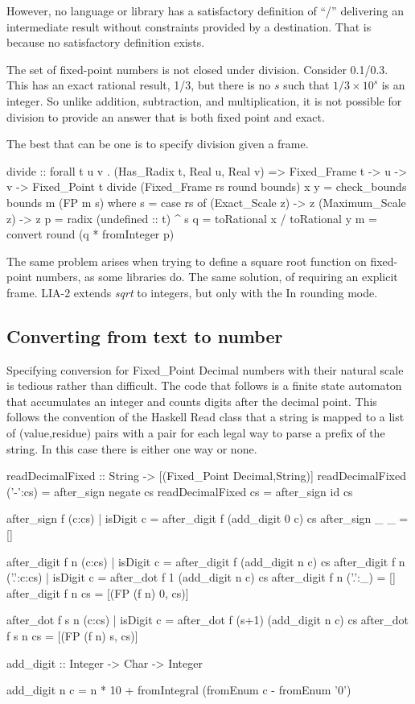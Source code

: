 \documentclass{article}
\begin{document}
However, no language or library has a satisfactory definition of
``/'' delivering an intermediate result without constraints
provided by a destination.  That is because no satisfactory
definition exists.

The set of fixed-point numbers is not closed under division.
Consider 0.1/0.3.  This has an exact rational result, 1/3,
but there is no $s$ such that $1/3 \times 10^s$ is an integer.
So unlike addition, subtraction, and multiplication, it is not
possible for division to provide an answer that is both fixed
point and exact.

The best that can be one is to specify division given a frame.

\begin{code}
divide :: forall t u v . (Has_Radix t, Real u, Real v) =>
          Fixed_Frame t -> u -> v -> Fixed_Point t
divide (Fixed_Frame rs round bounds) x y
  = check_bounds bounds m (FP m s)
  where
    s = case rs of
          (Exact_Scale   z) -> z
          (Maximum_Scale z) -> z
    p = radix (undefined :: t) ^ s
    q = toRational x / toRational y
    m = convert round (q * fromInteger p) 
\end{code}

The same problem arises when trying to define a square root
function on fixed-point numbers, as some libraries do.  The
same solution, of requiring an explicit frame.  LIA-2 extends
{\it sqrt} to integers, but only with the In rounding mode.

\subsection{Converting from text to number}

Specifying conversion for Fixed\_Point Decimal numbers
with their natural scale is tedious rather than difficult.
The code that follows is a finite state automaton that
accumulates an integer and counts digits after the decimal point.
This follows the convention of the Haskell Read class that
a string is mapped to a list of (value,residue) pairs with a
pair for each legal way to parse a prefix of the string.  In
this case there is either one way or none.

\begin{code}
readDecimalFixed :: String -> [(Fixed_Point Decimal,String)]
readDecimalFixed ('-':cs) = after_sign negate cs    
readDecimalFixed cs       = after_sign id     cs  

after_sign f (c:cs) 
  | isDigit c = after_digit f (add_digit 0 c) cs 
after_sign _ _ = []

after_digit f n (c:cs)
  | isDigit c = after_digit f (add_digit n c) cs     
after_digit f n ('.':c:cs)
  | isDigit c = after_dot f 1 (add_digit n c) cs                 
after_digit f n ('.':_) = []
after_digit f n cs = [(FP (f n) 0, cs)]
  
after_dot f s n (c:cs)
  | isDigit c = after_dot f (s+1) (add_digit n c) cs                
after_dot f s n cs = [(FP (f n) s, cs)]
  
add_digit :: Integer -> Char -> Integer

add_digit n c =
   n * 10 + fromIntegral (fromEnum c - fromEnum '0') 
\end{code}
\end{document}
